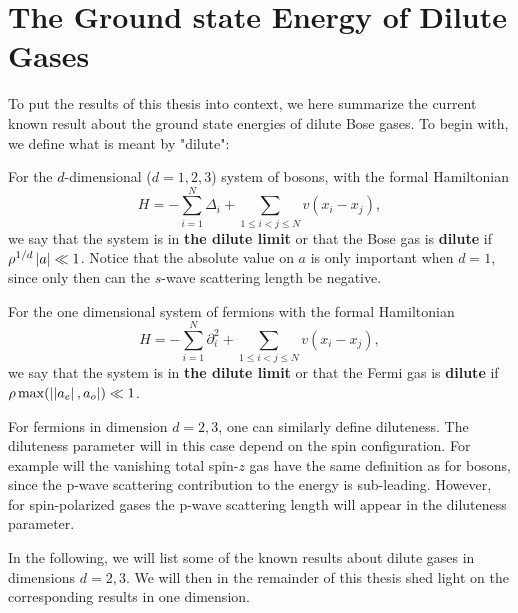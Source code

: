 \section{The Ground state Energy of Dilute Gases}
To put the results of this thesis into context, we here summarize the current known result about the ground state energies of dilute Bose gases. To begin with, we define what is meant by "dilute":
\begin{definition}
	For the $ d $-dimensional ($ d=1,2,3 $) system of bosons, with the formal Hamiltonian \begin{equation}
	H=-\sum_{i=1}^{N}\Delta_i+\sum_{1\leq i<j\leq N}v(x_i-x_j),
	\end{equation}
	we say that the system is in \textbf{ the dilute limit} or that the Bose gas is \textbf{dilute} if $ \rho^{1/d} \left\lvert a \right\rvert\ll 1 $. Notice that the absolute value on $ a $ is only important when $ d=1 $, since only then can the $ s $-wave scattering length be negative.
\end{definition}
\begin{definition}
	For the one dimensional system of fermions with the formal Hamiltonian \begin{equation}
	H=-\sum_{i=1}^{N}\partial^2_i+\sum_{1\leq i<j\leq N}v(x_i-x_j),
	\end{equation}
	we say that the system is in \textbf{ the dilute limit} or that the Fermi gas is \textbf{dilute} if $ \rho \max(\left\lvert \left\lvert a_e \right\rvert,a_o \right\rvert)\ll 1 $.
\end{definition}
\begin{remark}
	For fermions in dimension $ d=2,3 $, one can similarly define diluteness. The diluteness parameter will in this case depend on the spin configuration. For example will the vanishing total spin-$ z $ gas have the same definition as for bosons, since the p-wave scattering contribution to the energy is sub-leading. However, for spin-polarized gases the p-wave scattering length will appear in the diluteness parameter.
\end{remark}
In the following, we will list some of the known results about dilute gases in dimensions $ d=2,3 $. We will then in the remainder of this thesis shed light on the corresponding results in one dimension.
